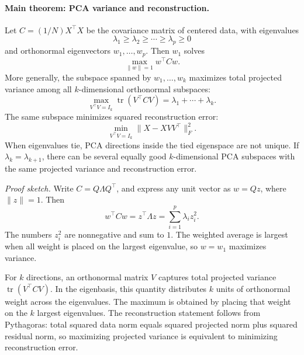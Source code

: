 \paragraph{Main theorem: PCA variance and reconstruction.}
Let \(C=(1/N)X^\top X\) be the covariance matrix of centered data, with eigenvalues
\[
\lambda_1\geq\lambda_2\geq\cdots\geq\lambda_p\geq 0
\]
and orthonormal eigenvectors \(w_1,\dots,w_p\). Then \(w_1\) solves
\[
\max_{\|w\|=1}w^\top Cw.
\]
More generally, the subspace spanned by \(w_1,\dots,w_k\) maximizes total projected variance among all \(k\)-dimensional orthonormal subspaces:
\[
\max_{V^\top V=I_k}\operatorname{tr}(V^\top C V)
=\lambda_1+\cdots+\lambda_k.
\]
The same subspace minimizes squared reconstruction error:
\[
\min_{V^\top V=I_k}\|X-XVV^\top\|_F^2.
\]
When eigenvalues tie, PCA directions inside the tied eigenspace are not unique. If \(\lambda_k=\lambda_{k+1}\), there can be several equally good \(k\)-dimensional PCA subspaces with the same projected variance and reconstruction error.

\emph{Proof sketch.} Write \(C=Q\Lambda Q^\top\), and express any unit vector as \(w=Qz\), where \(\|z\|=1\). Then
\[
w^\top Cw=z^\top\Lambda z=\sum_{i=1}^p\lambda_i z_i^2.
\]
The numbers \(z_i^2\) are nonnegative and sum to \(1\). The weighted average is largest when all weight is placed on the largest eigenvalue, so \(w=w_1\) maximizes variance.

For \(k\) directions, an orthonormal matrix \(V\) captures total projected variance \(\operatorname{tr}(V^\top C V)\). In the eigenbasis, this quantity distributes \(k\) units of orthonormal weight across the eigenvalues. The maximum is obtained by placing that weight on the \(k\) largest eigenvalues. The reconstruction statement follows from Pythagoras: total squared data norm equals squared projected norm plus squared residual norm, so maximizing projected variance is equivalent to minimizing reconstruction error.

